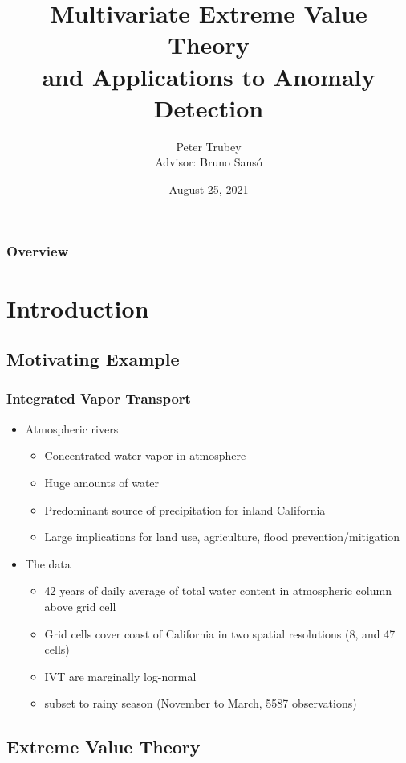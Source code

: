 \documentclass[aspectratio=169]{beamer}
\title{Multivariate Extreme Value Theory \\ and Applications to Anomaly Detection}
\author{Peter Trubey \\ Advisor: Bruno Sans{\'o}}
\institute{UCSC - Statistics Department}
\date[8/25/2021]{August 25, 2021}
\begin{document}
\begin{frame}[plain]
  \titlepage
\end{frame}

\begin{frame}[plain]
  \frametitle{Overview}
  \tableofcontents
\end{frame}

\section{Introduction}
\subsection{Motivating Example}
\begin{frame}
  \frametitle{Integrated Vapor Transport}
  \begin{itemize}
    \item Atmospheric rivers~\citep{ralph2013,ralph2018}
        \begin{itemize}
            \item Concentrated water vapor in atmosphere
            \item Huge amounts of water
            \item Predominant source of precipitation for inland California
            \item Large implications for land use, agriculture, flood prevention/mitigation
        \end{itemize}
    \item The data~\citep{guan2015}
        \begin{itemize}
            \item 42 years of daily average of total water content in atmospheric column above grid cell
            \item Grid cells cover coast of California in two spatial resolutions (8, and 47 cells) 
            \item IVT are marginally log-normal
            \item subset to rainy season (November to March, 5587 observations)
        \end{itemize}
  \end{itemize}
\end{frame}

\subsection{Extreme Value Theory}
\end{document}
